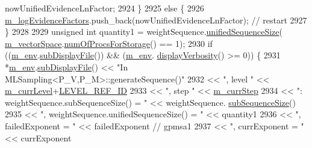 \begin{DoxyCode}
      nowUnifiedEvidenceLnFactor;
2924       \}
2925       \textcolor{keywordflow}{else} \{
2926         \hyperlink{class_q_u_e_s_o_1_1_m_l_sampling_a75f2ceab4a2c6774b3fa07d74221dbf3}{m\_logEvidenceFactors}.push\_back(nowUnifiedEvidenceLnFactor); \textcolor{comment}{// restart}
2927       \}
2928 
2929       \textcolor{keywordtype}{unsigned} \textcolor{keywordtype}{int} quantity1 = weightSequence.\hyperlink{class_q_u_e_s_o_1_1_scalar_sequence_a52829afc95e5c36e9db44f40854153b0}{unifiedSequenceSize}(
      \hyperlink{class_q_u_e_s_o_1_1_m_l_sampling_a7bc4c72f65ba9166ed94a6e198b0915b}{m\_vectorSpace}.\hyperlink{class_q_u_e_s_o_1_1_vector_space_a67b0c3620662116f5a346fdaa5faf38e}{numOfProcsForStorage}() == 1);
2930       \textcolor{keywordflow}{if} ((\hyperlink{class_q_u_e_s_o_1_1_m_l_sampling_a13f1ca4fe9f94822fe572a743eaced1d}{m\_env}.\hyperlink{class_q_u_e_s_o_1_1_base_environment_a8a0064746ae8dddfece4229b9ad374d6}{subDisplayFile}()) && (\hyperlink{class_q_u_e_s_o_1_1_m_l_sampling_a13f1ca4fe9f94822fe572a743eaced1d}{m\_env}.
      \hyperlink{class_q_u_e_s_o_1_1_base_environment_a1fe5f244fc0316a0ab3e37463f108b96}{displayVerbosity}() >= 0)) \{
2931         *\hyperlink{class_q_u_e_s_o_1_1_m_l_sampling_a13f1ca4fe9f94822fe572a743eaced1d}{m\_env}.\hyperlink{class_q_u_e_s_o_1_1_base_environment_a8a0064746ae8dddfece4229b9ad374d6}{subDisplayFile}() << \textcolor{stringliteral}{"In MLSampling<P\_V,P\_M>::generateSequence()"}
2932                                 << \textcolor{stringliteral}{", level "}                                  << 
      \hyperlink{class_q_u_e_s_o_1_1_m_l_sampling_af9416874c856e50f3b35270e801f17e4}{m\_currLevel}+\hyperlink{_m_l_sampling_level_options_8h_a68d15eaf394d210effcf584b938206d3}{LEVEL\_REF\_ID}
2933                                 << \textcolor{stringliteral}{", step "}                                   << 
      \hyperlink{class_q_u_e_s_o_1_1_m_l_sampling_a1b1f8ccb4823bdfa26ec652f0807c63e}{m\_currStep}
2934                                 << \textcolor{stringliteral}{": weightSequence.subSequenceSize() = "}     << weightSequence.
      \hyperlink{class_q_u_e_s_o_1_1_scalar_sequence_a0288ea295eedc216a1617b3286f6f3a0}{subSequenceSize}()
2935                                 << \textcolor{stringliteral}{", weightSequence.unifiedSequenceSize() = "} << quantity1
2936                                 << \textcolor{stringliteral}{", failedExponent = "}                       << failedExponent \textcolor{comment}{// gpmsa1}
2937                                 << \textcolor{stringliteral}{", currExponent = "}                         << currExponent

\end{DoxyCode}
